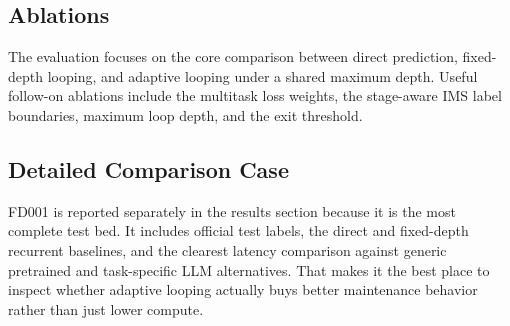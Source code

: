 \subsection{Ablations}
The evaluation focuses on the core comparison between direct prediction, fixed-depth looping, and adaptive looping under a shared maximum depth. Useful follow-on ablations include the multitask loss weights, the stage-aware IMS label boundaries, maximum loop depth, and the exit threshold.

\subsection{Detailed Comparison Case}
FD001 is reported separately in the results section because it is the most complete test bed. It includes official test labels, the direct and fixed-depth recurrent baselines, and the clearest latency comparison against generic pretrained and task-specific LLM alternatives. That makes it the best place to inspect whether adaptive looping actually buys better maintenance behavior rather than just lower compute.
